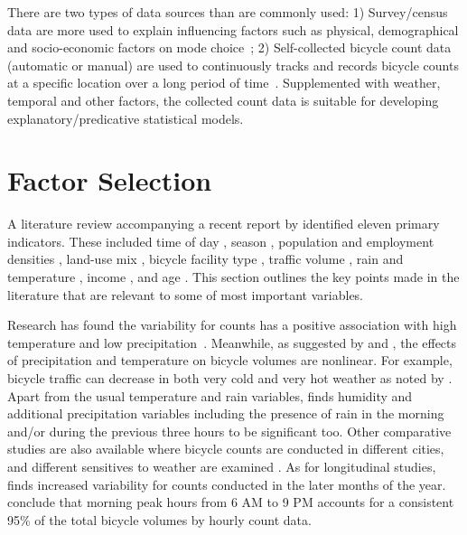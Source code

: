 \documentclass [11pt, proquest] {uwthesis}[2015/03/03]
\begin{document}
There are two types of data sources than are commonly used: 1) Survey/census data are more used to explain influencing factors such as physical, demographical and socio-economic factors on mode choice~\cite{Parkin:2008aa,Helbich:2014aa}; 2) Self-collected bicycle count data (automatic or manual) are used to continuously tracks and records bicycle counts at a specific location over a long period of time~\cite{Griswold:2011aa, Nosal:2014aa, Miranda-Moreno:2011aa, Thomas:2009aa}. Supplemented with weather, temporal and other factors, the collected count data is suitable for developing explanatory/predicative statistical models.  

\section{Factor Selection}

A literature review accompanying a recent report by \cite{Bassok:2011aa} identified eleven primary indicators. These included 
time of day \cite{Schwartz:1999aa}, season \cite{Niemeier:1996aa}, population and employment densities \cite{McCahil:2008aa,Pinjari:2009aa}, land-use mix \cite{Pinjari:2009aa}, bicycle facility type \cite{Hunt:2007aa},
traffic volume \cite{McDonald:2007aa}, rain and temperature \cite{Niemeier:1996aa,Parkin:2008aa}, income \cite{Turner:1998aa}, and age \cite{Hunt:2007aa}. This section outlines the key points made in the literature that are
relevant to some of most important variables. 

Research has found the variability for counts has a positive association with high temperature and low precipitation~\cite{Niemeier:1996aa,Parkin:2008aa}. Meanwhile, as suggested by \cite{Lewin:2011aa} and \cite{Thomas:2009aa}, the effects of precipitation and temperature on bicycle volumes are nonlinear. For example, bicycle traffic can decrease in both very cold and very hot weather as noted by \cite{Richardson:2000aa}. Apart from the usual temperature and rain variables, \cite{Miranda-Moreno:2011aa} finds humidity and additional precipitation variables including the presence of rain in the morning and/or during the previous three hours to be significant too. Other comparative studies are also available where bicycle counts are conducted in different cities, and different sensitives to weather are examined \cite{Rose:2011aa}. As for longitudinal studies, \cite{Niemeier:1996aa} finds increased variability for counts conducted in the later months of the year. \cite{Jones:2010aa} conclude that morning peak hours from 6 AM to 9 PM accounts for a consistent 95\% of the total bicycle volumes by hourly count data. 
\end{document}

